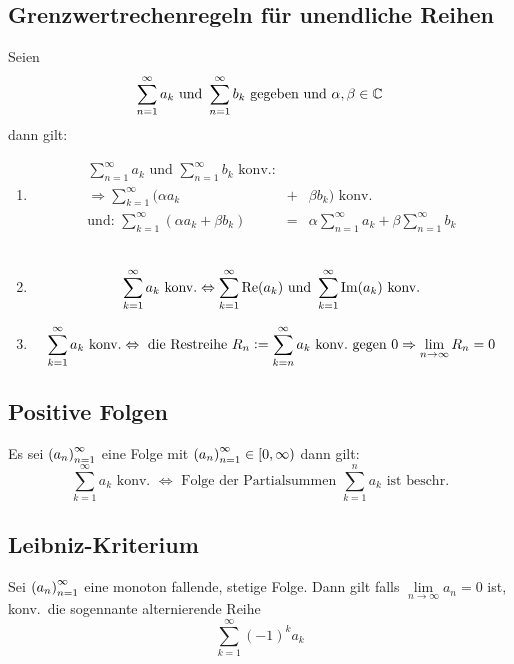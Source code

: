 \subsection{Grenzwertrechenregeln für unendliche Reihen}
Seien
\begin{equation*}
    \sum_{n=1}^\infty a_k \text{ und } \sum_{n=1}^\infty b_k
    \text{ gegeben und } \alpha,\beta \in \mathbb{C}
\end{equation*}
dann gilt:
\begin{enumerate}[label= (\alph*)]
    \item
        \begin{eqnarray*}
            \sum_{n=1}^\infty a_k \text{ und } \sum_{n=1}^\infty b_k \text{ konv.:}\\
            \Rightarrow \sum_{k=1}^\infty(\alpha a_k &+& \beta b_k) \text{ konv.}\\
            \text{und: }
            \sum_{k=1}^\infty(\alpha a_k + \beta b_k) &=& \alpha \sum_{n=1}^\infty a_k
            + \beta \sum_{n=1}^\infty b_k
        \end{eqnarray*}\\
    \item
        \begin{equation*}
            \sum_{k=1}^\infty a_k \text{ konv.} \Leftrightarrow
            \sum_{k=1}^\infty \operatorname{Re}(a_k) \text{ und }
            \sum_{k=1}^\infty \operatorname{Im}(a_k) \text{ konv.}
        \end{equation*}
    \item
        \begin{equation*}
            \sum_{k=1}^\infty a_k \text{ konv.} \Leftrightarrow
            \text{ die Restreihe } R_n := \sum_{k=n}^\infty a_k \text{ konv.\ gegen }0\\
            \Rightarrow \lim_{n \rightarrow \infty} R_n = 0
        \end{equation*}
\end{enumerate}

\subsection{Positive Folgen}
Es sei ${(a_n)}_{n=1}^\infty$ eine Folge mit ${(a_n)}_{n=1}^\infty \in \left[0, \infty\right)$ dann gilt:
\begin{equation*}
    \sum_{k=1}^\infty a_k \text{ konv. } \Leftrightarrow
    \text{ Folge der Partialsummen }\sum_{k=1}^n a_k \text{ ist beschr.}
\end{equation*}

\subsection{Leibniz-Kriterium}
Sei ${(a_n)}_{n=1}^\infty$ eine monoton fallende, stetige Folge. Dann gilt falls
$\lim\limits_{n \rightarrow \infty} a_n = 0$ ist, konv.\ die sogennante
alternierende Reihe
\begin{equation*}
    \sum_{k=1}^\infty {(-1)}^k a_k
\end{equation*}


